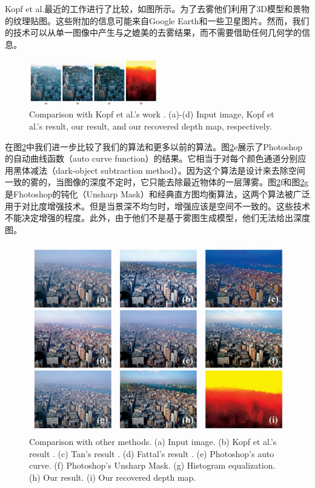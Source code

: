 \documentclass{ctexart}
\begin{document}
Kopf et al.\cite{KopfNeubertChenCohenCohenOrDeussenUyttendaeleLischinski2008}最近的工作进行了比较，如图所示。为了去雾他们利用了3D模型和景物的纹理贴图。这些附加的信息可能来自Google Earth和一些卫星图片。然而，我们的技术可以从单一图像中产生与之媲美的去雾结果，而不需要借助任何几何学的信息。\par

\begin{figure}[tbp]
	\centering
	\includegraphics[width=0.5\textwidth]{img/16.jpg}
	\caption{Comparison with Kopf et al.’s work \cite{KopfNeubertChenCohenCohenOrDeussenUyttendaeleLischinski2008}. (a)-(d) Input image, Kopf et al.’s result, our result, and our recovered depth map, respectively.}\label{fig:16}
\end{figure}

在图\ref{fig:17}中我们进一步比较了我们的算法和更多以前的算法。图\ref{fig:17}e展示了Photoshop的自动曲线函数（auto curve function）的结果。它相当于对每个颜色通道分别应用黑体减法（dark-object subtraction method）\cite{Chavez1988}。因为这个算法是设计来去除空间一致的雾的，当图像的深度不定时，它只能去除最近物体的一层薄雾。图\ref{fig:17}f和图\ref{fig:17}g是Fhotoshop的钝化（Unsharp Mask）和经典直方图均衡算法，这两个算法被广泛用于对比度增强技术。但是当景深不均匀时，增强应该是空间不一致的。这些技术不能决定增强的程度。此外，由于他们不是基于雾图生成模型，他们无法给出深度图。\par

\begin{figure}[tbp]
	\centering
	\includegraphics[width=\textwidth]{img/17.jpg}
	\caption{Comparison with other methods. (a) Input image. (b) Kopf et al.’s result \cite{KopfNeubertChenCohenCohenOrDeussenUyttendaeleLischinski2008}. (c) Tan’s result \cite{Tan2008}. (d) Fattal’s result \cite{Fattal2008}. (e) Photoshop’s auto curve. (f) Photoshop’s Unsharp Mask. (g) Histogram equalization. (h) Our result. (i) Our recovered depth map.}\label{fig:17}
\end{figure}
\end{document}
